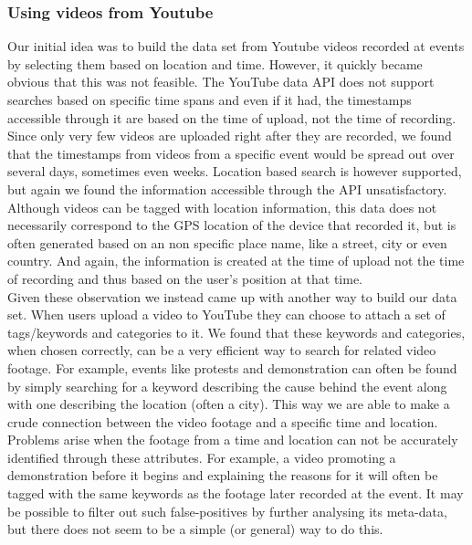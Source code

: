 \documentclass[12pt]{article}
\begin{document}
\subsubsection{Using videos from Youtube}
%
Our initial idea was to build the data set from Youtube videos recorded at events by selecting them based on location and time. However, it quickly became obvious that this was not feasible. The YouTube data API does not support searches based on specific time spans and even if it had, the timestamps accessible through it are based on the time of upload, not the time of recording. Since only very few videos are uploaded right after they are recorded, we found that the timestamps from videos from a specific event would be spread out over several days, sometimes even weeks. Location based search is however supported, but again we found the information accessible through the API unsatisfactory. Although videos can be tagged with location information, this data does not necessarily correspond to the GPS location of the device that recorded it, but is often generated based on an non specific place name, like a street, city or even country. And again, the information is created at the time of upload not the time of recording and thus based on the user's position at that time.\\
Given these observation we instead came up with another way to build our data set. When users upload a video to YouTube they can choose to attach a set of tags/keywords and categories to it. We found that these keywords and categories, when chosen correctly, can be a very efficient way to search for related video footage. For example, events like protests and demonstration can often be found by simply searching for a keyword describing the cause behind the event along with one describing the location (often a city). This way we are able to make a crude connection between the video footage and a specific time and location. Problems arise when the footage from a time and location can not be accurately identified through these attributes. For example, a video promoting a demonstration before it begins and explaining the reasons for it will often be tagged with the same keywords as the footage later recorded at the event. It may be possible to filter out such false-positives by further analysing its meta-data, but there does not seem to be a simple (or general) way to do this.
%
\end{document}
